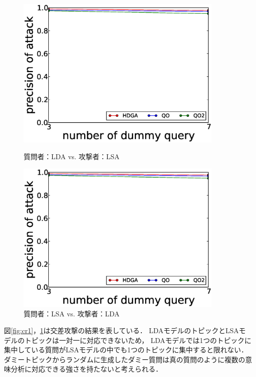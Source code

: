 \documentclass[master]{suribt}
\theoremstyle{definition}
\begin{document}
 \begin{figure}
 \begin{minipage}[t]{0.5\linewidth}
 \centering
 \includegraphics[width=0.9\textwidth]{CROSS1.eps}
 \vspace{5em}
 \caption{質問者：LDA vs. 攻撃者：LSA}
 \label{fig:cr1}
 \end{minipage}%
 \begin{minipage}[t]{0.5\linewidth}
 \centering
 \includegraphics[width=0.9\textwidth]{CROSS1.eps}
 \vspace{5em}
 \caption{質問者：LSA vs. 攻撃者：LDA}
 \label{fig:cr2}
 \end{minipage}
 \end{figure}

 図\ref{fig:cr1}，\ref{fig:cr2}は交差攻撃の結果を表している．
 LDAモデルのトピックとLSAモデルのトピックは一対一に対応できないため，
 LDAモデルでは1つのトピックに集中している質問がLSAモデルの中でも1つのトピックに集中すると限れない．
 ダミートピックからランダムに生成したダミー質問は真の質問のように複数の意味分析に対応できる強さを持たないと考えられる．
 
\end{document}
